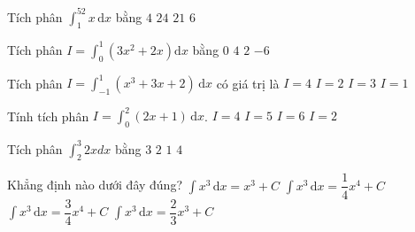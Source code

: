 

\begin{ex}%
	Tích phân $\displaystyle\int_1^52x\mathrm{\,d}x$  bằng
	\choice 
		{$4$} 
		 {\True $24$}
		 {$21$}
		{$6$} 
\end{ex}

\begin{ex}%
	Tích phân $I = \displaystyle\int_0^1  \left(3x^2 + 2x\right)\mathrm{d}x$ bằng
	 \choice
		{$0$} 
		 {$4$}
		 {\True $2$}
		 {$-6$}
\end{ex}

\begin{ex}%
	Tích  phân $I=\displaystyle\int_{-1}^1\left(x^3+3 x+2\right)\mathrm{\,d}x$ có giá trị là
	 \choice
		 {\True $I=4$}
		 {$I=2$}
		{$I=3$} 
		 {$I=1$}
\end{ex}

\begin{ex}%
	Tính tích phân  $I=\displaystyle\int_0^2 (2x+1)\mathrm{\,d}x$.
	\choice 
		 {$I=4$}
		 {$I=5$}
		 {\True $I=6$}
		 {$I=2$}
\end{ex}

\begin{ex}%
	 Tích phân $\displaystyle\int_{2}^{3}2xdx$ bằng
	 \choice
		 {\True $3$}
		 {$2$}
		 {$1$}
		{$4$} 
\end{ex}

\begin{ex}%
	Khẳng định  nào dưới đây đúng?
	 \choice
		{$\displaystyle\int x^3\,\mathrm{d}x  = x^3 + C$}
		{\True $\displaystyle\int x^3\,\mathrm{d}x = \dfrac{1}{4}x^4 + C$} 
		{$\displaystyle\int x^3\,\mathrm{d}x =  \dfrac{3}{4}x^4 + C$}
		 {$\displaystyle\int x^3\,\mathrm{d}x = \dfrac{2}{3}x^3 + C$}
	 \loigiai{
	 }
\end{ex}

